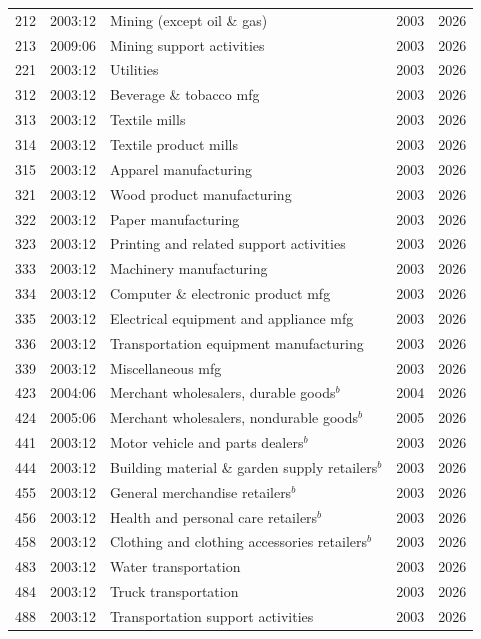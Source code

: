 {\begin{longtable}{llp{5cm}cc}
\midrule
212 & 2003:12 & Mining (except oil \& gas) & 2003 & 2026 \\
213 & 2009:06 & Mining support activities & 2003 & 2026 \\
221 & 2003:12 & Utilities & 2003 & 2026 \\
312 & 2003:12 & Beverage \& tobacco mfg & 2003 & 2026 \\
313 & 2003:12 & Textile mills & 2003 & 2026 \\
314 & 2003:12 & Textile product mills & 2003 & 2026 \\
315 & 2003:12 & Apparel manufacturing & 2003 & 2026 \\
321 & 2003:12 & Wood product manufacturing & 2003 & 2026 \\
322 & 2003:12 & Paper manufacturing & 2003 & 2026 \\
323 & 2003:12 & Printing and related support activities & 2003 & 2026 \\
333 & 2003:12 & Machinery manufacturing & 2003 & 2026 \\
334 & 2003:12 & Computer \& electronic product mfg & 2003 & 2026 \\
335 & 2003:12 & Electrical equipment  and appliance mfg & 2003 & 2026 \\
336 & 2003:12 & Transportation equipment manufacturing & 2003 & 2026 \\
339 & 2003:12 & Miscellaneous mfg & 2003 & 2026 \\
423 & 2004:06 & Merchant wholesalers, durable goods$^{b}$ & 2004 & 2026 \\
424 & 2005:06 & Merchant wholesalers, nondurable goods$^{b}$ & 2005 & 2026 \\
441 & 2003:12 & Motor vehicle and parts dealers$^{b}$ & 2003 & 2026 \\
444 & 2003:12 & Building material \& garden supply retailers$^{b}$ & 2003 & 2026 \\
455 & 2003:12 & General merchandise retailers$^{b}$ & 2003 & 2026 \\
456 & 2003:12 & Health and personal care retailers$^{b}$ & 2003 & 2026 \\
458 & 2003:12 & Clothing and clothing accessories retailers$^{b}$ & 2003 & 2026 \\
483 & 2003:12 & Water transportation & 2003 & 2026 \\
484 & 2003:12 & Truck transportation & 2003 & 2026 \\
488 & 2003:12 & Transportation support activities & 2003 & 2026 \\

\end{longtable}}
